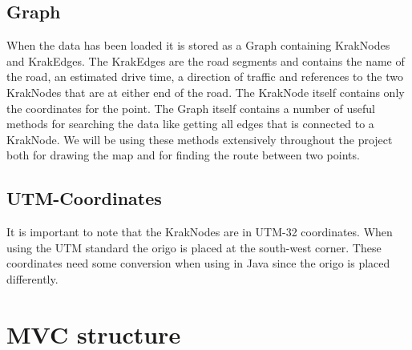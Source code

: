 \subsection{Graph}
When the data has been loaded it is stored as a Graph containing KrakNodes 
and KrakEdges. The KrakEdges are the road segments and contains the name 
of the road, an estimated drive time, a direction of traffic and references 
to the two KrakNodes that are at either end of the road.  The KrakNode itself 
contains only the coordinates for the point.
The Graph itself contains a number of useful methods for searching the data 
like getting all edges that is connected to a KrakNode. We will be using these 
methods extensively throughout the project both for drawing the map and for 
finding the route between two points.
\subsection{UTM-Coordinates}
It is important to note that the KrakNodes are in UTM-32 coordinates. When 
using the UTM standard the origo is placed at the south-west corner. These 
coordinates need some conversion when using in Java since the origo is placed 
differently.

\section{MVC structure}